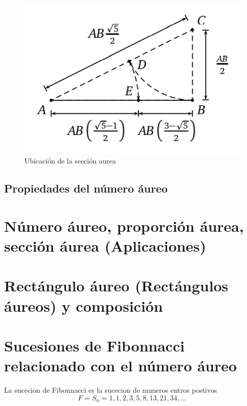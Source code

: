 \documentclass[
  11pt,
]{krantz}
\theoremstyle{definition}
\theoremstyle{definition}
\theoremstyle{definition}
\theoremstyle{definition}
\theoremstyle{remark}
\begin{document}
\begin{figure}[!ht]

{\centering \includegraphics[width=0.5\linewidth]{book1} 

}

\caption{Ubicación de la sección aurea}\label{fig:aureo1}
\end{figure}

\hypertarget{propiedades-del-nuxfamero-uxe1ureo}{%
\subsection{Propiedades del número áureo}\label{propiedades-del-nuxfamero-uxe1ureo}}

\hypertarget{nuxfamero-uxe1ureo-proporciuxf3n-uxe1urea-secciuxf3n-uxe1urea-aplicaciones}{%
\section{Número áureo, proporción áurea, sección áurea (Aplicaciones)}\label{nuxfamero-uxe1ureo-proporciuxf3n-uxe1urea-secciuxf3n-uxe1urea-aplicaciones}}

\hypertarget{rectuxe1ngulo-uxe1ureo-rectuxe1ngulos-uxe1ureos-y-composiciuxf3n}{%
\section{Rectángulo áureo (Rectángulos áureos) y composición}\label{rectuxe1ngulo-uxe1ureo-rectuxe1ngulos-uxe1ureos-y-composiciuxf3n}}

\hypertarget{sucesiones-de-fibonnacci-relacionado-con-el-nuxfamero-uxe1ureo}{%
\section{Sucesiones de Fibonnacci relacionado con el número áureo}\label{sucesiones-de-fibonnacci-relacionado-con-el-nuxfamero-uxe1ureo}}

La sucecion de Fibonnacci es la sucecion de numeros entros postivos
\[F=S_n={1,1,2,3,5,8,13,21,34, \ldots}\]
\end{document}
